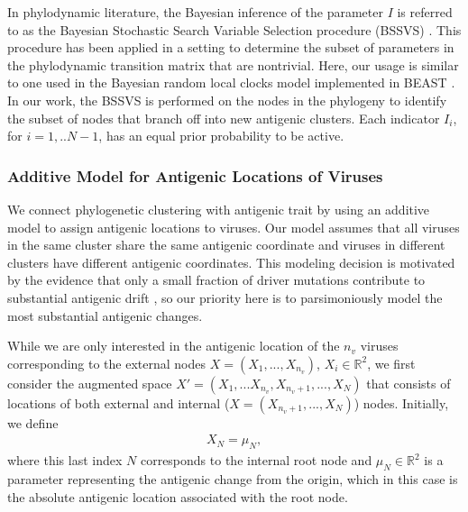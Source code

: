 \documentclass[11pt,oneside,letterpaper]{article}
\begin{document}
In phylodynamic literature, the Bayesian inference of the parameter $I$ is referred to as the Bayesian Stochastic Search Variable Selection procedure (BSSVS) \cite{lemey_bayesian_2009}.
This procedure has been applied in a setting to determine the subset of parameters in the phylodynamic transition matrix that are nontrivial. 
Here, our usage is similar to one used in the Bayesian random local clocks model implemented in BEAST \cite{drummond_bayesian_2010}.
In our work, the BSSVS is performed on the nodes in the phylogeny to identify the subset of nodes that branch off into new antigenic clusters. 
Each indicator $I_i$, for $i=1,..N-1$, has an equal prior probability to be active.



\subsubsection*{Additive Model for Antigenic Locations of Viruses}

We connect phylogenetic clustering with antigenic trait by using an additive model to assign antigenic locations to viruses. 
Our model assumes that all viruses in the same cluster share the same antigenic coordinate and viruses in different clusters have different antigenic coordinates.
This modeling decision is motivated by the evidence that only a small fraction of driver mutations contribute to substantial antigenic drift \cite{koel_substitutions_2013}, so our priority here is to parsimoniously model the most substantial antigenic changes.



While we are only interested in the antigenic location of the $n_v$ viruses corresponding to the external nodes $X=(X_1,..., X_{n_{v}})$, $X_i \in \mathbb{R}^{2}$, we first consider the augmented space $X' = (X_1, ...X_{n_v}, X_{ n_v +1},..., X_N)$ that consists of locations of both  external and internal ($X=(X_{n_v + 1},..., X_N)$) nodes.
Initially, we define
\begin{eqnarray}
 	X_{N} = \mu_N     ,
\end{eqnarray}
 where this last index $N$ corresponds to the internal root node and $\mu_N \in \mathbb{R}^{2}$ is a parameter representing the antigenic change from the origin, which in this case is the absolute antigenic location associated with the root node. 
\end{document}
